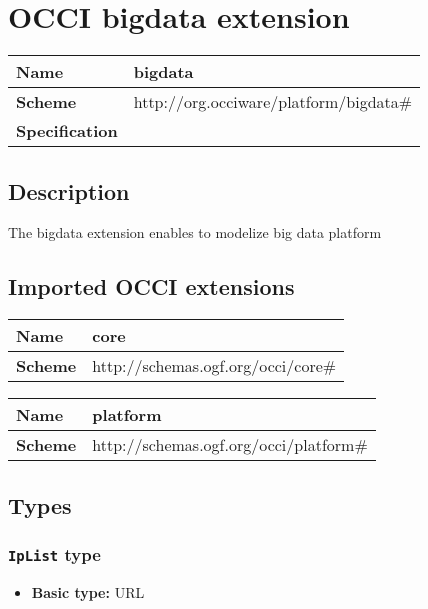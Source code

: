 \section{OCCI bigdata extension}
\begin{center}
\begin{tabular}{|l|l|}
  \hline
  \textbf{Name} & bigdata \\
  \hline  
  \textbf{Scheme} & http://org.occiware/platform/bigdata\# \\
  \hline
  \textbf{Specification} &  \\
  \hline
\end{tabular}
\end{center}

\subsection{Description}
The bigdata extension enables to modelize big data platform
\subsection{Imported OCCI extensions}

\begin{center} 
\begin{tabular}{|l|l|}
  \hline
  \textbf{Name} & core \\
  \hline  
  \textbf{Scheme} & http://schemas.ogf.org/occi/core\# \\
  \hline
\end{tabular}
\end{center}
\begin{center} 
\begin{tabular}{|l|l|}
  \hline
  \textbf{Name} & platform \\
  \hline  
  \textbf{Scheme} & http://schemas.ogf.org/occi/platform\# \\
  \hline
\end{tabular}
\end{center}


\subsection{Types}
\subsubsection{\texttt{IpList} type}

\begin{itemize}
\item \textbf{Basic type:} URL
\end{itemize}
